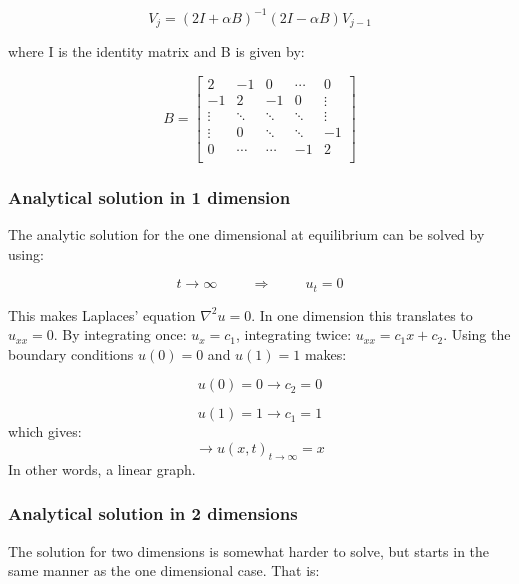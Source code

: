 \documentclass[10pt,a4paper]{article}
\begin{document}
\begin{equation}
V_j = (2I + \alpha B)^{-1}(2I - \alpha B)V_{j-1}
\end{equation}

\noindent where I is the identity matrix and B is given by:

\begin{equation}
B = \begin{bmatrix}
2 & -1 & 0 & \cdots &0\\
-1 & 2 & -1 & 0 & \vdots\\
\vdots & \ddots & \ddots & \ddots & \vdots\\
\vdots & 0 & \ddots & \ddots & -1\\
0 & \cdots & \cdots & -1 & 2\\
\end{bmatrix}
\end{equation}
\vspace{0.5cm}
\subsubsection*{Analytical solution in 1 dimension}
\noindent The analytic solution for the one dimensional at equilibrium can be solved by using:


\begin{equation} 
t\rightarrow\infty \hspace{1cm} \Rightarrow \hspace{1cm}u_t=0
\end{equation}

\noindent This makes Laplaces' equation $\nabla^2u=0$. In one dimension this translates to $u_{xx}=0$. By integrating once: $u_x=c_1$, integrating twice: $u_{xx}=c_1x+c_2$. Using the boundary conditions $u(0)=0$ and $u(1)=1$ makes:

\begin{equation}
u(0)=0\rightarrow c_2=0
\end{equation}

\begin{equation}
u(1)=1 \rightarrow c_1=1
\end{equation}
which gives:
\begin{equation}
\rightarrow u(x,t)_{t\rightarrow\infty}=x
\end{equation}
\noindent In other words, a linear graph.\\
\vspace{0.5cm}
\subsubsection*{Analytical solution in 2 dimensions}
The solution for two dimensions is somewhat harder to solve, but starts in the same manner as the one dimensional case. That is:\\
\end{document}
